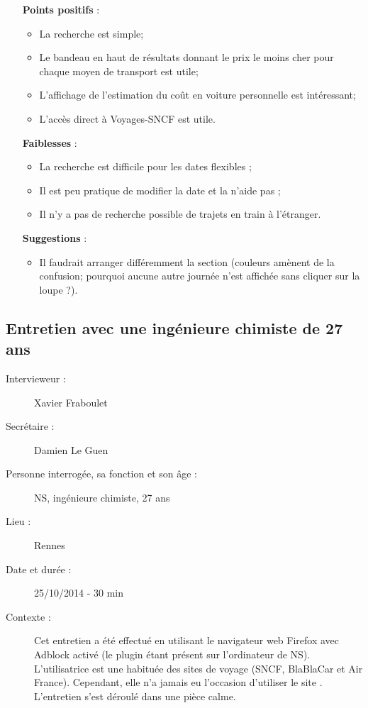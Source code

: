 \begin{itemize}
  \item [\textbf{Points positifs}] :
      \begin{itemize}
        \item La recherche est simple;
        \item Le bandeau en haut de r\'{e}sultats donnant le prix le moins cher pour chaque moyen de transport est utile;
        \item L'affichage de l'estimation du co\^{u}t en voiture personnelle est int\'{e}ressant;
        \item L'acc\`{e}s direct \`{a} Voyages-SNCF est utile.
      \end{itemize}
      
  \item [\textbf{Faiblesses}] :
      \begin{itemize}
        \item La recherche est difficile pour les dates flexibles ;
    \item Il est peu pratique de modifier la date et la  n'aide pas ;
        \item Il n'y a pas de recherche possible de trajets en train \`{a} l'\'{e}tranger.
      \end{itemize}
      
  \item [\textbf{Suggestions}] :
      \begin{itemize}
        \item Il faudrait arranger diff\'{e}remment la section  (couleurs am\`{e}nent de la confusion; pourquoi aucune autre journ\'{e}e n'est affich\'{e}e sans cliquer sur la loupe ?).
      \end{itemize}
\end{itemize}


\subsection{Entretien avec une ing\'{e}nieure chimiste de 27 ans}

\begin{description}
\item [Intervieweur :] Xavier Fraboulet
\item [Secr\'{e}taire :] Damien Le Guen
\item [Personne interrog\'{e}e, sa fonction et son \^{a}ge :] NS, ing\'{e}nieure chimiste, 27 ans
\item [Lieu :] Rennes
\item [Date et dur\'{e}e :] 25/10/2014 - 30 min
\item [Contexte :] Cet entretien a \'{e}t\'{e} effectu\'{e} en utilisant le navigateur web Firefox avec Adblock activ\'{e} (le plugin \'{e}tant pr\'{e}sent sur l'ordinateur de NS). L'utilisatrice est une habitu\'{e}e des sites de voyage (SNCF, BlaBlaCar et Air France). Cependant, elle n'a jamais eu l'occasion d'utiliser le site \kel. L'entretien s'est d\'{e}roul\'{e} dans une pi\`{e}ce calme. 
\end{description}


